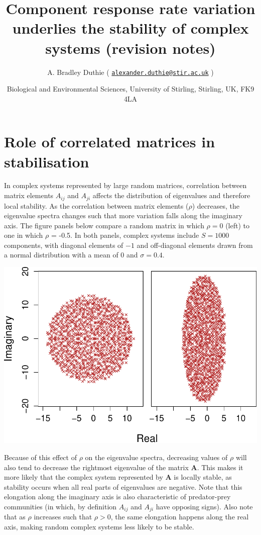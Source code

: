 \documentclass[]{article}
\title{Component response rate variation underlies the stability of complex
systems (revision notes)}
\author{A. Bradley Duthie (
\href{mailto:alexander.duthie@stir.ac.uk}{\nolinkurl{alexander.duthie@stir.ac.uk}}
)}
\date{Biological and Environmental Sciences, University of Stirling, Stirling,
UK, FK9 4LA}
\begin{document}
\maketitle

\hypertarget{role-of-correlated-matrices-in-stabilisation}{%
\section{Role of correlated matrices in
stabilisation}\label{role-of-correlated-matrices-in-stabilisation}}

In complex systems represented by large random matrices, correlation
between matrix elements \(A_{ij}\) and \(A_{ji}\) affects the
distribution of eigenvalues and therefore local stability. As the
correlation between matrix elements (\(\rho\)) decreases, the eigenvalue
spectra changes such that more variation falls along the imaginary axis.
The figure panels below compare a random matrix in which \(\rho = 0\)
(left) to one in which \(\rho\) = -0.5. In both panels, complex systems
include \(S = 1000\) components, with diagonal elements of \(-1\) and
off-diagonal elements drawn from a normal distribution with a mean of
\(0\) and \(\sigma = 0.4\).

\includegraphics{revision_notes_files/figure-latex/unnamed-chunk-2-1.pdf}

Because of this effect of \(\rho\) on the eigenvalue spectra, decreasing
values of \(\rho\) will also tend to decrease the rightmost eigenvalue
of the matrix \(\textbf{A}\). This makes it more likely that the complex
system represented by \(\textbf{A}\) is locally stable, as stability
occurs when all real parts of eigenvalues are negative. Note that this
elongation along the imaginary axis is also characteristic of
predator-prey communities (in which, by definition \(A_{ij}\) and
\(A_{ji}\) have opposing signs). Also note that as \(\rho\) increases
such that \(\rho > 0\), the same elongation happens along the real axis,
making random complex systems less likely to be stable.
\end{document}
